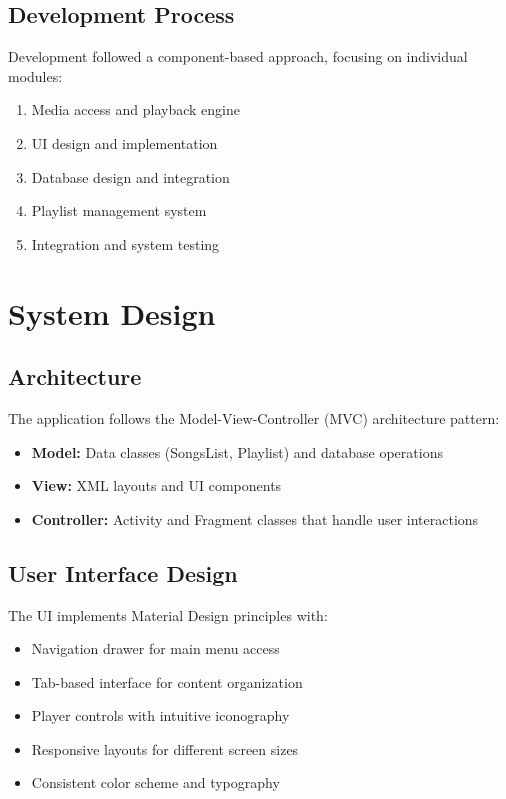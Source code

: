 \documentclass{article}
\begin{document}
\subsection{Development Process}
Development followed a component-based approach, focusing on individual modules:
\begin{enumerate}
    \item Media access and playback engine
    \item UI design and implementation
    \item Database design and integration
    \item Playlist management system
    \item Integration and system testing
\end{enumerate}

\section{System Design}
\subsection{Architecture}
The application follows the Model-View-Controller (MVC) architecture pattern:
\begin{itemize}
    \item \textbf{Model:} Data classes (SongsList, Playlist) and database operations
    \item \textbf{View:} XML layouts and UI components
    \item \textbf{Controller:} Activity and Fragment classes that handle user interactions
\end{itemize}

\subsection{User Interface Design}
The UI implements Material Design principles with:
\begin{itemize}
    \item Navigation drawer for main menu access
    \item Tab-based interface for content organization
    \item Player controls with intuitive iconography
    \item Responsive layouts for different screen sizes
    \item Consistent color scheme and typography
\end{itemize}
\end{document}
